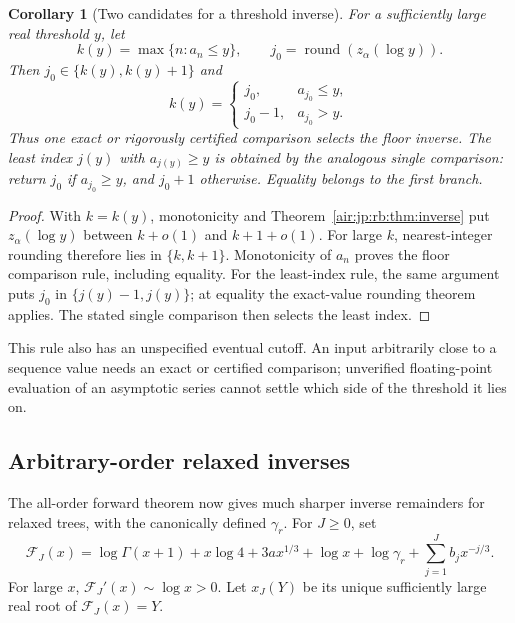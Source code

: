 \documentclass[11pt,letterpaper]{article}
\numberwithin{equation}{section}
\newtheorem{corollary}[theorem]{Corollary}
\theoremstyle{remark}
\begin{document}
\begin{corollary}[Two candidates for a threshold inverse]\label{air:jp:rb:cor:threshold}
For a sufficiently large real threshold $y$, let
\[
 k(y)=\max\{n:a_n\le y\},\qquad j_0=\operatorname{round}(z_\alpha(\log y)).
\]
Then $j_0\in\{k(y),k(y)+1\}$ and
\[
 k(y)=\begin{cases}
 j_0,&a_{j_0}\le y,\\
 j_0-1,&a_{j_0}>y.
 \end{cases}
\]
Thus one exact or rigorously certified comparison selects the floor inverse. The least index $j(y)$ with $a_{j(y)}\ge y$ is obtained by the analogous single comparison: return $j_0$ if $a_{j_0}\ge y$, and $j_0+1$ otherwise. Equality belongs to the first branch.
\end{corollary}
\begin{proof}
With $k=k(y)$, monotonicity and Theorem~\ref{air:jp:rb:thm:inverse} put
$z_\alpha(\log y)$ between $k+o(1)$ and $k+1+o(1)$. For large $k$, nearest-integer rounding therefore lies in $\{k,k+1\}$. Monotonicity of $a_n$ proves the floor comparison rule, including equality. For the least-index rule, the same argument puts $j_0$ in $\{j(y)-1,j(y)\}$; at equality the exact-value rounding theorem applies. The stated single comparison then selects the least index.
\end{proof}
This rule also has an unspecified eventual cutoff. An input arbitrarily close to a sequence value needs an exact or certified comparison; unverified floating-point evaluation of an asymptotic series cannot settle which side of the threshold it lies on.

\subsection{Arbitrary-order relaxed inverses}
The all-order forward theorem now gives much sharper inverse remainders for relaxed trees, with the canonically defined $\gamma_r$. For $J\ge0$, set
\begin{equation}\label{air:jp:rb:eq:FJ}
 \mathcal F_J(x)=\log\Gamma(x+1)+x\log4+3ax^{1/3}+\log x+\log\gamma_r
                 +\sum_{j=1}^Jb_jx^{-j/3}.
\end{equation}
For large $x$, $\mathcal F_J'(x)\sim\log x>0$. Let $x_J(Y)$ be its unique sufficiently large real root of $\mathcal F_J(x)=Y$.
\end{document}
